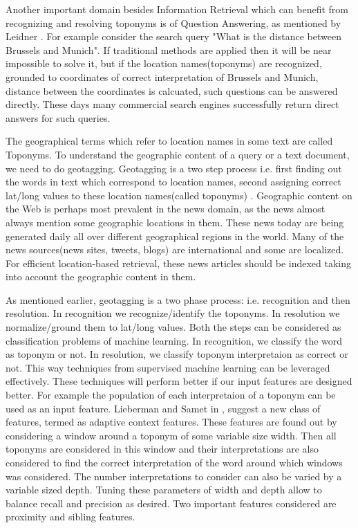 \documentclass[
     11pt,         %
     a4paper,      %
     oneside,
     ]{article}
\begin{document}
Another important domain besides Information Retrieval which can benefit from recognizing and resolving toponyms is of Question Answering, as mentioned by Leidner \cite{Leidner:2008:PhD}. For example consider the search query "What is the distance between Brussels and Munich". If traditional methods are applied then it will be near impossible to solve it, but if the location names(toponyms) are recognized, grounded to coordinates of correct interpretation of Brussels and Munich, distance between the coordinates is calcuated, such questions can be answered directly. These days many commercial search engines successfully return direct answers for such queries. 

The geographical terms which refer to location names in some text are called Toponyms. To understand the geographic content of a query or a text document, we need to do geotagging. Geotagging is a two step process i.e. first finding out the words in text which correspond to location names, second assigning correct lat/long values to these location names(called toponyms) \cite{Lieberman12adaptivecontext}. Geographic content on the Web is perhaps most prevalent in the news domain, as the news almost always mention some geographic locations in them. These news today are being generated daily all over different geographical regions in the world. Many of the news sources(news sites, tweets, blogs) are international and some are localized. For efficient location-based retrieval, these news articles should be indexed taking into account the geographic content in them.

As mentioned earlier, geotagging is a two phase process: i.e. recognition and then resolution. In recognition we recognize/identify the toponyms. In resolution we normalize/ground them to lat/long values. Both the steps can be considered as classification problems of machine learning. In recognition, we classify the word as toponym or not. In resolution, we classify toponym interpretaion as correct or not. This way techniques from supervised machine learning can be leveraged effectively. These techniques will perform better if our input features are designed better. For example the population of each interpretaion of a toponym can be used as an input feature. Lieberman and Samet in \cite{Lieberman12adaptivecontext}, suggest a new class of features, termed as adaptive context features. These features are found out by considering a window around a toponym of some variable size width. Then all toponyms are considered in this window and their interpretations are also considered to find the correct interpretation of the word around which windows was considered. The number interpretations to consider can also be varied by a variable sized depth. Tuning these parameters of width and depth allow to balance recall and precision as desired. Two important features considered are proximity and sibling features. 
\end{document}
